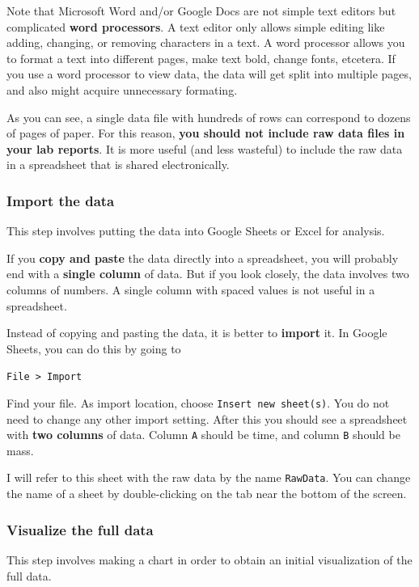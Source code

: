 Note that Microsoft Word and/or Google Docs are not simple text editors but complicated \textbf{word processors}. A text editor only allows simple editing like adding, changing, or removing characters in a text. A word processor allows you to format a text into different pages, make text bold, change fonts, etcetera. If you use a word processor to view data, the data will get split into multiple pages, and also might acquire unnecessary formating.

As you can see, a single data file with hundreds of rows can correspond to dozens of pages of paper. For this reason, \textbf{you should not include raw data files in your lab reports}. It is more useful (and less wasteful) to include the raw data in a spreadsheet that is shared electronically.
\subsubsection{Import the data}
This step involves putting the data into Google Sheets or Excel for analysis.

If you \textbf{copy and paste} the data directly into a spreadsheet, you will probably end with a \textbf{single column} of data. But if you look closely, the data involves two columns of numbers. A single column with spaced values is not useful in a spreadsheet.

Instead of copying and pasting the data, it is better to \textbf{import} it. In Google Sheets, you can do this by going to
\begin{center}
    \texttt{File > Import}
\end{center}
Find your file. As import location, choose \texttt{Insert new sheet(s)}. You do not need to change any other import setting. After this you should see a spreadsheet with \textbf{two columns} of data. Column \texttt{A} should be time, and column \texttt{B} should be mass.

I will refer to this sheet with the raw data by the name \texttt{RawData}. You can change the name of a sheet by double-clicking on the tab near the bottom of the screen.
\subsubsection{Visualize the full data}
This step involves making a chart in order to obtain an initial visualization of the full data.

